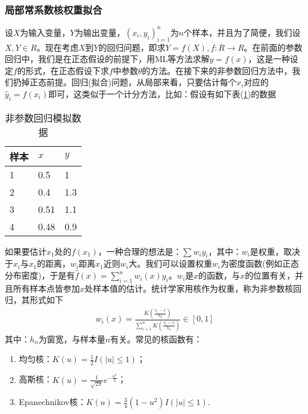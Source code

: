         \subsubsection{局部常系数核权重拟合}
            \par
            设$X$为输入变量，$Y$为输出变量，$(x_i,y_i)_{i=1}^n$为$n$个样本，并且为了简便，我们设$X,Y\in R$。现在考虑$X$到$Y$的回归问题，即求$Y=f(X),f:R\to R$。在前面的参数回归中，我们是在正态假设的前提下，用ML等方法求解$y = f(x)$，这是一种设定$f$的形式，在正态假设下求$f$中参数$\theta$的方法。在接下来的非参数回归方法中，我们扔掉正态前提。回归(拟合)问题，从局部来看，只要估计每个$x_i$对应的$\hat{y}_i=f(x_i)$即可，这类似于一个计分方法，比如：假设有如下表(\ref{tab:非参数回归模拟数据})的数据
            \begin{table}[H]
              \caption{非参数回归模拟数据}
              \label{tab:非参数回归模拟数据}
              \centering
              \begin{tabular}{l|ll}
              \toprule
              样本   & $x$    & $y$ \\
              \midrule
              1      & 0.5    & 1   \\
              2      & 0.4    & 1.3 \\
              3      & 0.51   & 1.1 \\
              4      & 0.48   & 0.9 \\
              \bottomrule
              \end{tabular}
            \end{table}
            如果要估计$x_1$处的$f(x_1)$，一种合理的想法是：$\sum w_i y_i$，其中：$w_i$是权重，取决于$x_i$与$x_1$的距离，$w_i$距离$x_1$近则$w_i$大。我们可以设置权重$w_i$为密度函数(例如正态分布密度)，于是有$\hat{f}(x) = \sum_{i=1}^nw_i(x)y_i$。$w_i$是$x$的函数，与$x$的位置有关，并且所有样本点皆参加$x$处样本值的估计。统计学家用核作为权重，称为非参数核回归，其形式如下
            \begin{align*}
            w_i(x) = \frac{K \left( \frac{x_i - x}{h_n} \right)  }{\sum\limits_{i=1}^nK \left( \frac{x_i - x}{h_n} \right)} \in [0,1]
            \end{align*}
            其中：$h_n$为窗宽，与样本量$n$有关。常见的核函数有：
            \begin{enumerate}
            \item 均匀核：$K(u) = \frac{1}{2}I(|u| \leqslant 1)$；
            \item 高斯核：$K(u) = \frac{1}{\sqrt{2\pi}}e^{-\frac{u^2}{2}}$；
            \item Epanechnikov核：$K(u) = \frac{3}{4}(1-u^2)I(|u| \leqslant 1)$.
            \end{enumerate}
